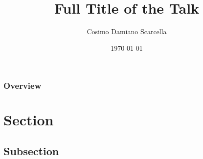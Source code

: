 \documentclass[xcolor=table]{beamer}
\title[Short title]{Full Title of the Talk} %
\author{Cosimo Damiano Scarcella} %
\institute[Unibo] %
{
Università di Bologna\\ %
\medskip

\href{http://www.cosimoscarcella.com}{www.cosimoscarcella.com}


}
\date{\today} %
\begin{document}
\begin{frame}
\titlepage %
\end{frame}

\begin{frame}
\frametitle{Overview} %
\tableofcontents %
\end{frame}



\section{Section} %

\subsection{Subsection} %

\end{document}
